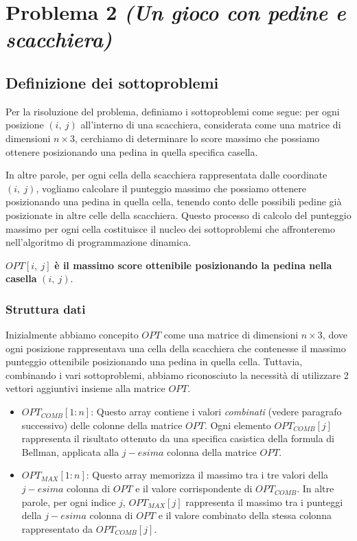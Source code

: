 \section{Problema 2 \textit{(Un gioco con pedine e scacchiera)}}

\subsection{Definizione dei sottoproblemi}

Per la risoluzione del problema, definiamo i sottoproblemi come segue: per ogni posizione $(i,\ j)$ all'interno di una scacchiera, 
considerata come una matrice di dimensioni $n \times 3$, cerchiamo di determinare lo score massimo che possiamo ottenere posizionando 
una pedina in quella specifica casella.
\newline

In altre parole, per ogni cella della scacchiera rappresentata dalle coordinate $(i,\ j)$, vogliamo calcolare 
il punteggio massimo che possiamo ottenere posizionando una pedina in quella cella, tenendo conto delle possibili pedine 
già posizionate in altre celle della scacchiera. Questo processo di calcolo del punteggio massimo per ogni cella 
costituisce il nucleo dei sottoproblemi che affronteremo nell'algoritmo di programmazione dinamica.

\begin{center}
	$OPT[i,\ j]$ \textbf{è il massimo score ottenibile posizionando la pedina nella casella} $(i,\ j)$.
\end{center}

\subsubsection*{Struttura dati}

Inizialmente abbiamo concepito $OPT$ come una matrice di dimensioni $n \times 3$, dove ogni posizione rappresentava una cella 
della scacchiera che contenesse il massimo punteggio ottenibile posizionando una pedina in quella cella. 
Tuttavia, combinando i vari sottoproblemi, abbiamo riconosciuto la necessità di utilizzare 2 vettori aggiuntivi insieme 
alla matrice $OPT$. 

\begin{itemize}
	\item $OPT_{COMB}[1:n]$: Questo array contiene i valori \textit{combinati} (vedere paragrafo successivo) 
	      delle colonne della matrice $OPT$. Ogni elemento $OPT_{COMB}[j]$ rappresenta il
	      risultato ottenuto da una specifica casistica della formula di Bellman,
	      applicata alla $j-esima$ colonna della matrice $OPT$.
	\item $OPT_{MAX}[1:n]$: Questo array memorizza il massimo tra i tre valori della $j-esima$
	      colonna di $OPT$ e il valore corrispondente di $OPT_{COMB}$. In altre parole,
	      per ogni indice $j$, $OPT_{MAX}[j]$ rappresenta il massimo tra i punteggi della $j-esima$
	      colonna di $OPT$ e il valore combinato della stessa colonna rappresentato da $OPT_{COMB}[j]$.
\end{itemize}

